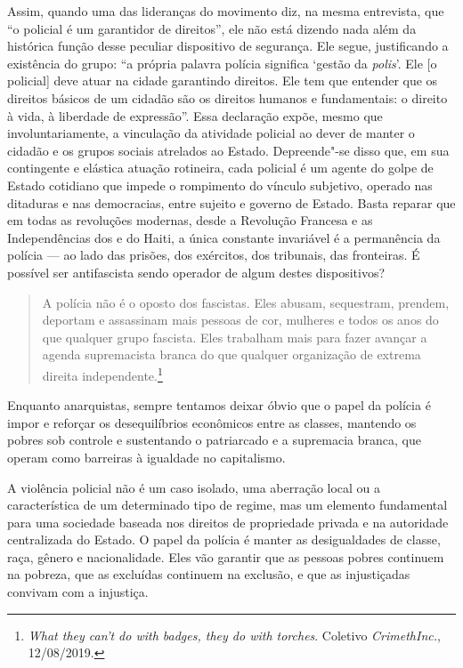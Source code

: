 Assim, quando uma das lideranças do movimento diz, na mesma entrevista, que ``o policial é um garantidor de direitos'', ele não está dizendo nada além da histórica função desse peculiar dispositivo de segurança. Ele segue, justificando a existência do grupo: ``a própria palavra polícia significa `gestão da \emph{polis}'. Ele [o policial] deve atuar na cidade garantindo direitos. Ele tem que entender que os direitos básicos de um cidadão são os direitos humanos e fundamentais: o direito à vida, à liberdade de expressão''. Essa declaração expõe, mesmo que involuntariamente, a vinculação da atividade policial ao dever de manter o cidadão e os grupos sociais atrelados ao Estado. Depreende"-se disso que, em sua contingente e elástica atuação rotineira, cada policial é um agente do golpe de Estado cotidiano que impede o rompimento do vínculo subjetivo, operado nas ditaduras e nas democracias, entre sujeito e governo de Estado. Basta reparar que em todas as revoluções modernas, desde a Revolução Francesa e as Independências dos  e do Haiti, a única constante invariável é a permanência da polícia --- ao lado das prisões, dos exércitos, dos tribunais, das fronteiras. É possível ser antifascista sendo operador de algum destes dispositivos?

\begin{quote}
A polícia não é o oposto dos fascistas. Eles abusam, sequestram, prendem, deportam e assassinam mais pessoas de cor, mulheres e  todos os anos do que qualquer grupo fascista. Eles trabalham mais para fazer avançar a agenda supremacista branca do que qualquer organização de extrema direita independente.\footnote{\emph{What they can't do with badges, they do with torches}. Coletivo \emph{CrimethInc.}, 12/08/2019.}
\end{quote}

Enquanto anarquistas, sempre tentamos deixar óbvio que o papel da polícia é impor e reforçar os desequilíbrios econômicos entre as classes, mantendo os pobres sob controle e sustentando o patriarcado e a supremacia branca, que operam como barreiras à igualdade no capitalismo.

A violência policial não é um caso isolado, uma aberração local ou a característica de um determinado tipo de regime, mas um elemento fundamental para uma sociedade baseada nos direitos de propriedade privada e na autoridade centralizada do Estado. O papel da polícia é manter as desigualdades de classe, raça, gênero e nacionalidade. Eles vão garantir que as pessoas pobres continuem na pobreza, que as excluídas continuem na exclusão, e que as injustiçadas convivam com a injustiça.

